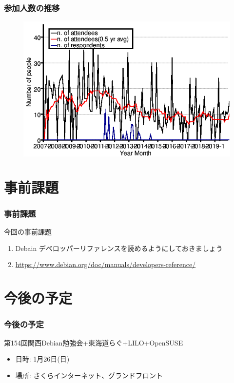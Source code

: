 \documentclass[cjk,dvipdfmx,10pt,compress,%
hyperref={bookmarks=true,bookmarksnumbered=true,bookmarksopen=false,%
colorlinks=false,%
pdftitle={第 153 回 関西 Debian 勉強会},%
pdfauthor={おおつき},%
pdfsubject={資料},%
}]{beamer}
\begin{document}
\begin{frame}[fragile]
  \frametitle{参加人数の推移}
	\begin{figure}[htb]	
 	\includegraphics[scale=0.5]{image201912/kansai.png}
	\end{figure}	
\end{frame}


\section{事前課題}

\begin{frame}[fragile]
  \frametitle{事前課題}
  \begin{block}{今回の事前課題}
    \begin{enumerate}
    \item Debain デベロッパーリファレンスを読めるようにしておきましょう
    \item \url{https://www.debian.org/doc/manuals/developers-reference/}
    \end{enumerate}
  \end{block}
\end{frame}


\section{今後の予定}
\begin{frame}[fragile]
  \frametitle{今後の予定}

  \begin{block}{第154回関西Debian勉強会+東海道らぐ+LILO+OpenSUSE}
    \begin{itemize}
    \item 日時: 1月26日(日)
    \item 場所: さくらインターネット、グランドフロント
    \end{itemize}
  \end{block}

\end{frame}
\end{document}
